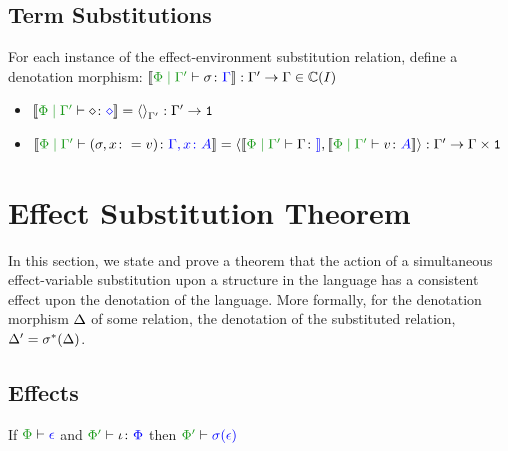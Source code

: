 \documentclass{report}
\begin{document}
\section{Term Substitutions}
For each instance of the effect-environment substitution relation, define a denotation morphism: $\deno{\etyperelation{\P}{\G'}{\si}{\G}}: \G' \rightarrow \G \in \C(I)$

\begin{itemize}
    \item $\deno{\etyperelation{\P}{\G'}{\nil}{\nil}} = \term{\G'}: \G' \rightarrow \1$
    \item $\deno{\etyperelation{\P}{\G'}{(\si, x \setto v)}{\gax}} = \pr{\deno{\etyperelation{\P}{\G'}{\G}}}{\deno{\etyperelation{\P}{\G'}{v}{A}}}: \G' \rightarrow \G\times \1$
\end{itemize}

\chapter{Effect Substitution Theorem}
In this section, we state and prove a theorem that the action of a simultaneous effect-variable substitution upon a structure in the language has a consistent effect upon the denotation of the language. More formally, for the denotation morphism $\Delta$ of some relation, the denotation of the substituted relation, $\Delta' = \sigma^*(\Delta)$.


\section{Effects}

\begin{theorem}
    If $\wellformed{\P}{\e}$ and $\typerelation{\P'}{\i}{\P}$ then $\wellformed{\P'}{\si(\e)}$   
\end{theorem}
\end{document}
